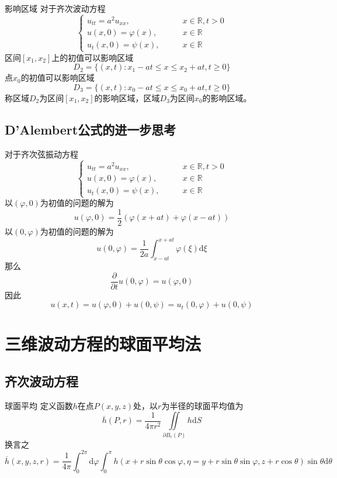 \documentclass[lang = cn, scheme = chinese, thmcnt = section]{elegantbook}
\newcommand{\R}{\mathbb{R}}            %
\newcommand{\dd}{\mathrm{d}}           %
\newcommand{\IInt}{\iint\limits}
\begin{document}
\begin{definition}{影响区域}
	对于齐次波动方程
	$$
	\begin{cases}
		u_{tt}=a^2u_{xx},\qquad & x\in \R,t>0\\
		u(x,0)=\varphi(x),\qquad & x\in \R\\
		u_t(x,0)=\psi(x),\qquad & x\in \R
	\end{cases}
	$$
	区间$[x_1,x_2]$上的初值可以影响区域%
	$$
	D_2=\{ (x,t):x_1-at\le x \le x_2+at,t\ge 0 \}
	$$
	点$x_0$的初值可以影响区域%
	$$
	D_3=\{ (x,t):x_0-at\le x \le x_0+at,t\ge 0 \}
	$$
	称区域$D_2$为区间$[x_1,x_2]$的影响区域，区域$D_3$为区间$x_0$的影响区域。
\end{definition}

\subsection{D'Alembert公式的进一步思考}

对于齐次弦振动方程
$$
\begin{cases}
	u_{tt}=a^2u_{xx},\qquad & x\in \R,t>0\\
	u(x,0)=\varphi(x),\qquad & x\in \R\\
	u_t(x,0)=\psi(x),\qquad & x\in \R
\end{cases}
$$
以$(\varphi,0)$为初值的问题的解为
$$
u(\varphi,0)=\frac{1}{2}(\varphi(x+at)+\varphi(x-at))
$$
以$(0,\varphi)$为初值的问题的解为
$$
u(0,\varphi)=\frac{1}{2a}\int_{x-at}^{x+at}\varphi(\xi)\dd\xi
$$
那么
$$
\frac{\partial }{\partial t}u(0,\varphi)=u(\varphi,0)
$$
因此%
$$
u(x,t)=u(\varphi,0)+u(0,\psi)=u_t(0,\varphi)+u(0,\psi)
$$

\section{三维波动方程的球面平均法}

\subsection{齐次波动方程}

\begin{definition}{球面平均}
	定义函数$h$在点$P(x,y,z)$处，以$r$为半径的球面平均值为
	$$
	\overline{h}(P,r)=\frac{1}{4\pi r^2}\IInt_{\partial B_r(P)}h\dd S
	$$
	换言之%
	$$
	\overline{h}(x,y,z,r)
	=\frac{1}{4\pi}\int_{0}^{2\pi}\dd\varphi\int_{0}^{\pi}
	h(x+r\sin\theta\cos\varphi,\eta=y+r\sin\theta\sin\varphi,z+r\cos\theta)\sin\theta\dd\theta
	$$
\end{definition}
\end{document}
